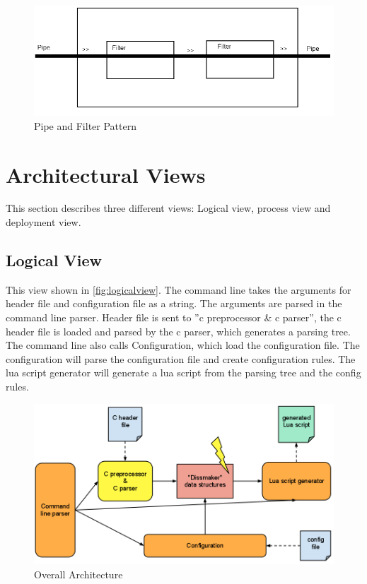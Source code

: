 \begin{figure}[htb]
	\includegraphics[width=\textwidth]{./planning/img/PipeAndFilter}
	\caption{Pipe and Filter Pattern\label{fig:pipefilter}}
\end{figure}


\section{Architectural Views}
This section describes three different views: Logical view, process view and deployment view.

\subsection{Logical View}
This view shown in \autoref{fig:logicalview}. The command line takes the arguments for \gls{header} file and configuration file as a string. The arguments are parsed in the command line \gls{parser}. Header file is sent to ''\Gls{c} \gls{preprocessor} \& \Gls{c} \gls{parser}'', the \Gls{c} \gls{header} file is loaded and parsed by the \Gls{c} \gls{parser}, which generates a parsing tree. The command line also calls Configuration, which load the configuration file. The configuration will parse the configuration file and create configuration rules. The \Gls{lua} \gls{script} generator will generate a \Gls{lua} \gls{script} from the parsing tree and the config rules.

\begin{figure}[htb]
	\includegraphics[width=\textwidth]{./planning/img/overall_design}
	\caption{Overall Architecture\label{fig:logicalview}}
\end{figure}


